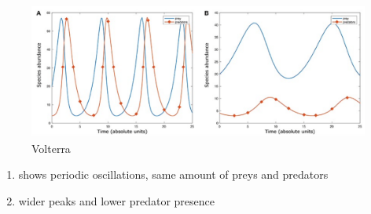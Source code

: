 \begin{figure}
\centering
\includegraphics[width=\textwidth]{volterra.png}
\caption{Volterra}
\label{fig:Volterra}
\end{figure}

\begin{enumerate}
\def\labelenumi{\Alph{enumi})}
\item
  shows periodic oscillations, same amount of preys and predators
\item
  wider peaks and lower predator presence
\end{enumerate}
